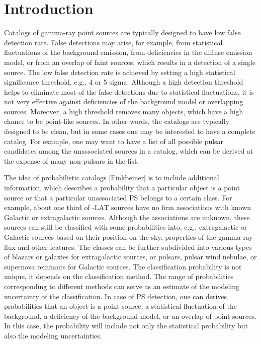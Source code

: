 \section{Introduction}

Catalogs of gamma-ray point sources are typically designed to have low false detection rate. False detections may arise, for example, from statistical fluctuations of the background emission, from deficiencies in the diffuse emission model, or from an overlap of faint sources, which results in a detection of a single source.
The low false detection rate is achieved by setting a high statistical significance threshold, e.g., 4 or 5 sigma.
Although a high detection threshold helps to eliminate most of the false detections due to statistical fluctuations, it is not very effective against deficiencies of the background model or overlapping sources. 
Moreover, a high threshold removes many objects, which have a high chance to be point-like sources.
In other words, the catalogs are typically designed to be clean, but in some cases one may be interested to have a complete catalog. For example, one may want to have a list of all possible pulsar candidates among the unassociated sources in a catalog, which can be derived at the expense of many non-pulsars in the list.

The idea of probabilistic catalogs [Finkbeiner] is to include additional information, which describes a probability that a particular object is a point source or that a particular unassociated PS belongs to a certain class. 
For example, about one third of \Fermi-LAT sources have no firm associations with known Galactic or extragalactic sources. 
Although the associations are unknown, these sources can still be classified with some probabilities into, e.g., extragalactic or Galactic sources based on their position on the sky, properties of the gamma-ray flux and other features.
The classes can be further subdivided into various types of blazars or galaxies for extragalactic sources, or pulsars, pulsar wind nebulae, or supernova remnants for Galactic sources.
The classification probability is not unique, it depends on the classification method. The range of probabilities corresponding to different methods can serve as an estimate of the modeling uncertainty of the classification. In case of PS detection, one can derives probabilities that an object is a point source, a statistical fluctuation of the background, a deficiency of the background model, or an overlap of point sources. 
In this case, the probability will include not only the statistical probability but also the modeling uncertainties.

